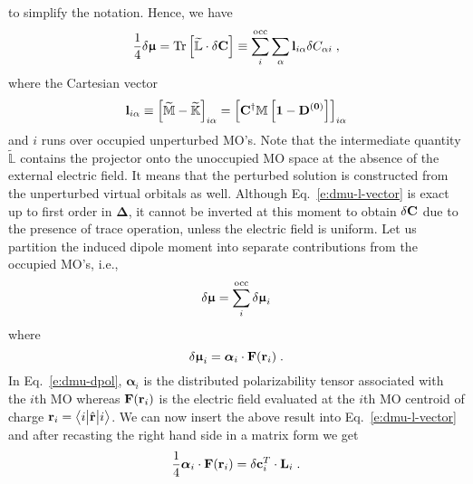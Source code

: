 \documentclass[aip,graphicx]{revtex4-1}
\newcommand{\tbraket}[3]{\ensuremath{\bigl\langle {#1} \bigl\lvert {#2} \bigl\lvert {#3} \bigr\rangle}}
\newcommand{\BM}[1]{\bm{#1}}
\DeclareMathOperator{\Tr}{Tr}
\begin{document}
%
to simplify the notation. Hence, we have
%
\begin{equation} \label{e:dmu-l-vector}
  \frac{1}{4} 
 \delta {\BM{\upmu}} %
   =
   \Tr{ 
    \left[ 
         \widetilde{\mathbb{L}} \cdot \delta {\bf C}
    \right] }
   \equiv \sum_{i}^{\rm occ} \sum_\alpha {\bf l}_{i\alpha} \delta C_{\alpha i} \;,
\end{equation}
%
where the Cartesian vector
%
\begin{equation}\label{e:l-vector}
 {\bf l}_{i\alpha} \equiv \left[ \widetilde{\mathbb{M}} - \widetilde{\mathbb{K}} \right]_{i\alpha} 
      = \left[  {\bf C}^\dagger \mathbb{M} \left[ \bf{1} - \bf{D}^{(0)} \right] \right]_{i\alpha}
\end{equation}
%
and $i$ runs over occupied unperturbed MO's.
Note that the intermediate quantity $\widetilde{\mathbb{L}}$ contains the projector onto
the unoccupied MO space at the absence of the external electric field. It means that the
perturbed solution is constructed from the unperturbed virtual orbitals as well.
Although Eq.~\eqref{e:dmu-l-vector}
is exact up to first order in ${\BM\Delta}$, it cannot be inverted at this moment to obtain $\delta {\bf C}$
due to the presence of trace operation, unless the electric field is uniform.
Let us partition the induced dipole moment into separate contributions
from the occupied MO's, i.e.,
%
\begin{equation} \label{e:dmu-part}
 \delta {\BM{\upmu}} = \sum_i^{\rm occ} \delta {\BM{\upmu}}_i
\end{equation}
%
where
%
\begin{equation} \label{e:dmu-dpol}
 \delta {\BM{\upmu}}_i = {\BM{\alpha}}_i \cdot {\bf F}({\bf r}_i) \;.
\end{equation}
%
In Eq.~\eqref{e:dmu-dpol}, ${\BM{\alpha}}_i$ is the distributed polarizability tensor
associated with the $i$th MO whereas ${\bf F}({\bf r}_i)$ is the electric field evaluated at the $i$th MO centroid of charge
${\bf r}_i = \tbraket{i}{\hat{\bf r}}{i}$.
We can now insert the above result into Eq.~\eqref{e:dmu-l-vector} 
and after recasting the right hand side in a matrix form
we get
%
\begin{equation} \label{e:dmu-l-vector-mo-transform-X}
 \frac{1}{4} {\BM{\alpha}}_i \cdot {\bf F}({\bf r}_i) 
   =
   \delta {\bf c}_i^T \cdot {\bf L}_i \;.
\end{equation}
\end{document}
